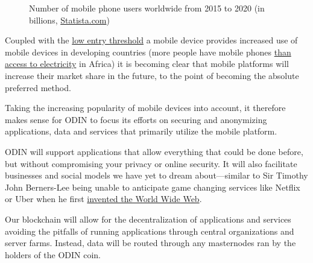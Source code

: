 \documentclass[12pt,letterpaper]{article}
\begin{document}
\begin{figure}[!h]
\centering
{}
\caption*{Number of mobile phone users worldwide from 2015 to 2020 (in billions, \href{https://www.statista.com}{Statista.com})}
\end{figure}

Coupled with the \href{http://gs.statcounter.com/platform-market-share/desktop-mobile-tablet}{low entry threshold} a mobile device provides increased use of mobile devices in developing countries (more people have mobile phones \href{https://www.economist.com/graphic-detail/2017/11/08/in-much-of-sub-saharan-africa-mobile-phones-are-more-common-than-access-to-electricity}{than access to electricity} in Africa) it is becoming clear that mobile platforms will increase their market share in the future, to the point of becoming the absolute preferred method.

Taking the increasing popularity of mobile devices into account, it therefore makes sense for ODIN to focus its efforts on securing and anonymizing applications, data and services that primarily utilize the mobile platform.

ODIN will support applications that allow everything that could be done before, but without compromising your privacy or online security. It will also facilitate businesses and social models we have yet to dream about---similar to Sir Timothy John Berners-Lee being unable to anticipate game changing services like Netflix or Uber when he first \href{https://en.wikipedia.org/wiki/Tim_Berners-Lee}{invented the World Wide Web}.

Our blockchain will allow for the decentralization of applications and services avoiding the pitfalls of running applications through central organizations and server farms. Instead, data will be routed through any masternodes ran by the holders of the ODIN coin.
\end{document}
